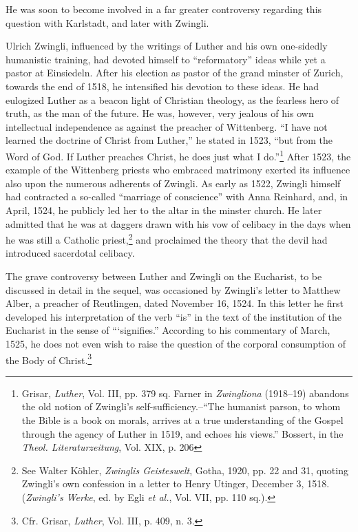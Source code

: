 He was soon to become involved in a far greater controversy regarding
this question with Karlstadt, and later with Zwingli.

Ulrich Zwingli, influenced by the writings of Luther and his own
one-sidedly humanistic training, had devoted himself to “reformatory”
ideas while yet a pastor at Einsiedeln. After his election as pastor of
the grand minster of Zurich, towards the end of 1518, he
intensified his devotion to these ideas. He had eulogized Luther as a
beacon light of Christian theology, as the fearless hero of truth, as
the man of the future. He was, however, very jealous of his own intellectual
independence as against the preacher of Wittenberg. “I
have not learned the doctrine of Christ from Luther,” he stated in
1523, “but from the Word of God. If Luther preaches Christ, he
does just what I do.”\footnote
{Grisar, \textit{Luther}, Vol. III, pp. 379 sq. Farner in \textit{Zwingliona} (1918--19) abandons the
old notion of Zwingli’s self-sufficiency.--“The humanist parson, to whom the Bible is a
book on morals, arrives at a true understanding of the Gospel through the agency of
Luther in 1519, and echoes his views.” Bossert, in the \textit{Theol. Literaturzeitung}, Vol. XIX,
p. 206}
After 1523, the example of the Wittenberg
priests who embraced matrimony exerted its influence also upon the
numerous adherents of Zwingli. As early as 1522, Zwingli himself
had contracted a so-called “marriage of conscience” with Anna
Reinhard, and, in April, 1524, he publicly led her to the altar in the
minster church. He later admitted that he was at daggers drawn with
his vow of celibacy in the days when he was still a Catholic priest,\footnote
{See Walter Köhler, \textit{Zwinglis Geisteswelt}, Gotha, 1920, pp. 22 and 31, quoting Zwingli’s
own confession in a letter to Henry Utinger, December 3, 1518. (\textit{Zwingli’s Werke}, ed. by
Egli \textit{et al.}, Vol. VII, pp. 110 sq.).}
and proclaimed the theory that the devil had introduced sacerdotal
celibacy.

The grave controversy between Luther and Zwingli on the Eucharist, to
be discussed in detail in the sequel, was occasioned by
Zwingli’s letter to Matthew Alber, a preacher of Reutlingen, dated
November 16, 1524. In this letter he first developed his interpretation
of the verb “is” in the text of the institution of the Eucharist in the
sense of “‘signifies.” According to his commentary of March, 1525,
he does not even wish to raise the question of the corporal consumption
of the Body of Christ.\footnote{Cfr. Grisar, \textit{Luther}, Vol. III, p. 409, n. 3.}

